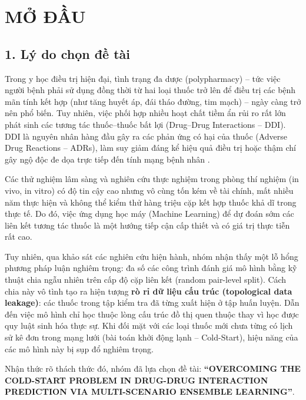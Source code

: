\documentclass[12pt,a4paper,oneside]{report}
\newcommand{\tendetai}{OVERCOMING THE COLD-START PROBLEM IN DRUG-DRUG INTERACTION PREDICTION VIA MULTI-SCENARIO ENSEMBLE LEARNING}
\newcommand{\unnumberedchapter}[1]{%
  \chapter*{#1}\phantomsection\addcontentsline{toc}{chapter}{#1}\markboth{#1}{}}
\begin{document}
\clearpage
{}
\pagestyle{fancy}

\unnumberedchapter{MỞ ĐẦU}

\section*{1. Lý do chọn đề tài}
Trong y học điều trị hiện đại, tình trạng đa dược (polypharmacy) -- tức việc người bệnh phải sử dụng đồng thời từ hai loại thuốc trở lên để điều trị các bệnh mãn tính kết hợp (như tăng huyết áp, đái tháo đường, tim mạch) -- ngày càng trở nên phổ biến. Tuy nhiên, việc phối hợp nhiều hoạt chất tiềm ẩn rủi ro rất lớn phát sinh các tương tác thuốc--thuốc bất lợi (Drug--Drug Interactions -- DDI). DDI là nguyên nhân hàng đầu gây ra các phản ứng có hại của thuốc (Adverse Drug Reactions -- ADRs), làm suy giảm đáng kể hiệu quả điều trị hoặc thậm chí gây ngộ độc đe dọa trực tiếp đến tính mạng bệnh nhân \cite{pirmohamed2004adverse}.

Các thử nghiệm lâm sàng và nghiên cứu thực nghiệm trong phòng thí nghiệm (in vivo, in vitro) có độ tin cậy cao nhưng vô cùng tốn kém về tài chính, mất nhiều năm thực hiện và không thể kiểm thử hàng triệu cặp kết hợp thuốc khả dĩ trong thực tế. Do đó, việc ứng dụng học máy (Machine Learning) để dự đoán sớm các liên kết tương tác thuốc là một hướng tiếp cận cấp thiết và có giá trị thực tiễn rất cao.

Tuy nhiên, qua khảo sát các nghiên cứu hiện hành, nhóm nhận thấy một lỗ hổng phương pháp luận nghiêm trọng: đa số các công trình đánh giá mô hình bằng kỹ thuật chia ngẫu nhiên trên cấp độ cặp liên kết (random pair-level split). Cách chia này vô tình tạo ra hiện tượng \textbf{rò rỉ dữ liệu cấu trúc (topological data leakage)}: các thuốc trong tập kiểm tra đã từng xuất hiện ở tập huấn luyện. Dẫn đến việc mô hình chỉ học thuộc lòng cấu trúc đồ thị quen thuộc thay vì học được quy luật sinh hóa thực sự. Khi đối mặt với các loại thuốc mới chưa từng có lịch sử kê đơn trong mạng lưới (bài toán khởi động lạnh -- Cold-Start), hiệu năng của các mô hình này bị sụp đổ nghiêm trọng. 

Nhận thức rõ thách thức đó, nhóm đã lựa chọn đề tài: \textbf{``\tendetai''}.
\end{document}
